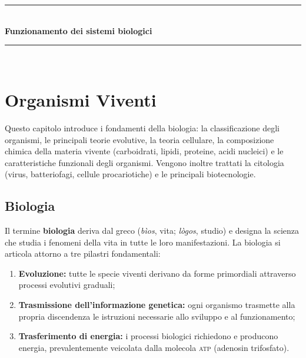 \documentclass[11pt,a4paper,openright,twoside]{book}
\theoremstyle{definition}
\theoremstyle{plain}
\theoremstyle{remark}
\newcommand{\atp}{\textsc{atp}}
\begin{document}

\begin{titlepage}
  \centering
  \vspace*{2cm}
  {\color{PrimaryBlue}\rule{\linewidth}{1pt}}\\[0.5cm]
  {\Huge\bfseries\color{PrimaryBlue} Funzionamento dei sistemi biologici}\\[0.5cm]
  {\color{PrimaryBlue}\rule{\linewidth}{1pt}}\\[0.5cm]
  \vfill
\end{titlepage}

\frontmatter

\tableofcontents
\cleardoublepage

\mainmatter

\chapter{Organismi Viventi}

\begin{tcolorbox}[summarybox, title={Sommario del capitolo}]
Questo capitolo introduce i fondamenti della biologia: la classificazione degli organismi, le principali teorie evolutive, la teoria cellulare, la composizione chimica della materia vivente (carboidrati, lipidi, proteine, acidi nucleici) e le caratteristiche funzionali degli organismi. Vengono inoltre trattati la citologia (virus, batteriofagi, cellule procariotiche) e le principali biotecnologie.
\end{tcolorbox}

\section{Biologia}

Il termine \textbf{biologia} deriva dal greco (\textit{bìos}, vita; \textit{lògos}, studio) e designa la scienza che studia i fenomeni della vita in tutte le loro manifestazioni. La biologia si articola attorno a tre pilastri fondamentali:
\begin{enumerate}
  \item \textbf{Evoluzione:} tutte le specie viventi derivano da forme primordiali attraverso processi evolutivi graduali;
  \item \textbf{Trasmissione dell'informazione genetica:} ogni organismo trasmette alla propria discendenza le istruzioni necessarie allo sviluppo e al funzionamento;
  \item \textbf{Trasferimento di energia:} i processi biologici richiedono e producono energia, prevalentemente veicolata dalla molecola \atp{} (adenosin trifosfato).
\end{enumerate}
\end{document}
